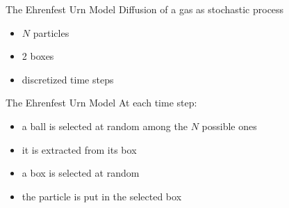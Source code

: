 \begin{frame}{The Ehrenfest Urn Model} %
    Diffusion of a gas as \alert{stochastic process}
    \begin{itemize}
      \item $N$ particles
      \item 2 boxes
      \item discretized time steps
    \end{itemize}
   
    \begin{figure}
      \begin{center}
        
      \end{center}
    \end{figure}

  \end{frame}

  \begin{frame}{The Ehrenfest Urn Model}
    At each time step:
    \begin{itemize}
      \item<1-> \alert<1>{a ball is selected at random among the $N$ possible ones}
      \item<2-> \alert<2>{it is extracted from its box}
      \item<3-> \alert<3>{a box is selected at random}
      \item<4-> \alert<4>{the particle is put in the selected box}
    \end{itemize}

    \medskip
        \begin{figure}[b]
        \begin{center}
        \end{center}
        \end{figure}
  \end{frame}